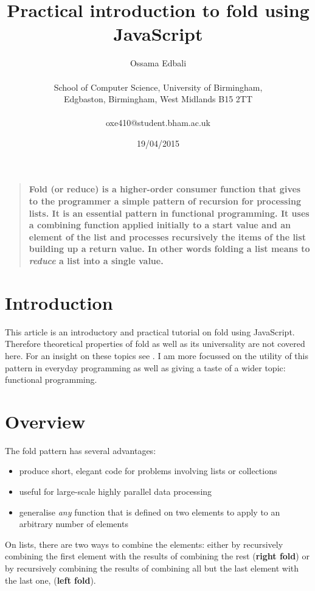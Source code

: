 \documentclass[12pt]{article}
\title{Practical introduction to fold using JavaScript}
\author
{Ossama Edbali\\
\\
\normalsize{School of Computer Science, University of Birmingham,}\\
\normalsize{Edgbaston, Birmingham, West Midlands B15 2TT}\\
\\
\normalsize{oxe410@student.bham.ac.uk}
}
\date{19/04/2015}
\newenvironment{mabstract}{%
\begin{quote} \bf}
{\end{quote}}
\begin{document}
 


\baselineskip24pt

\maketitle 


\begin{mabstract}
	Fold (or reduce) is a higher-order consumer function that gives to the programmer
	a simple pattern of recursion for processing lists. It is an essential pattern
	in functional programming. It uses a combining function applied initially to a start
	value and an element of the list and processes recursively the items of the list
	building up a return value.
	In other words folding a list means to \textit{reduce} a list into a single value.
\end{mabstract}

\section*{Introduction}
This article is an introductory and practical tutorial on fold using JavaScript. Therefore theoretical
properties of fold as well as its universality are not covered here. For an insight on these topics
see \cite{univ_fold}.
I am more focussed on the utility of this pattern in everyday programming as well as giving a taste
of a wider topic: functional programming.

\section*{Overview}
The fold pattern has several advantages:
\begin{itemize}
	\item produce short, elegant code for problems involving lists or collections \cite{cornell_fold}
	\item useful for large-scale highly parallel data processing
	\item generalise \textit{any} function that is defined on two elements to apply to an arbitrary number of elements
\end{itemize}

On lists, there are two ways to combine the elements: either by recursively combining the first element with the results of combining the rest (\textbf{right fold}) or by recursively combining the results of combining all but the last element with the last one, (\textbf{left fold}).
\end{document}
